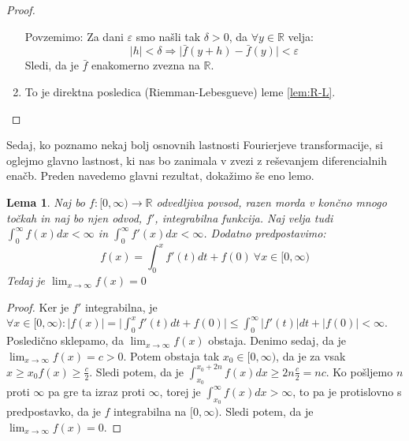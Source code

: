 \documentclass[a4paper, 10pt]{article}
\newtheorem{lem}{Lema}
\newcommand{\abs}[1]{\ensuremath{\lvert #1 \rvert}}
\newcommand{\mth}[1]{\ensuremath{\mathbb{#1}}}
\newcommand{\R}{\mth{R}}
\newcommand{\map}[3]{\ensuremath{{#1}: {#2} \rightarrow {#3}}}
\begin{document}
\begin{proof}
\begin{enumerate}
					Povzemimo: Za dani $\varepsilon$ smo našli tak $\delta> 0$, da $\forall y\in\R$ velja: $$\abs{h} < \delta \Rightarrow \abs{\bar{f}(y+h)-\bar{f}(y)} < \varepsilon$$
					Sledi, da je $\bar{f}$ enakomerno zvezna na $\R$.
					\item To je direktna posledica (Riemman-Lebesgueve) leme \ref{lem:R-L}.
				\end{enumerate}
			\end{proof}
			
			Sedaj, ko poznamo nekaj bolj osnovnih lastnosti Fourierjeve transformacije, si oglejmo glavno lastnost, ki nas bo zanimala v zvezi z reševanjem diferencialnih enačb. Preden navedemo glavni rezultat, dokažimo še eno lemo.
			
			\begin{lem}
				\label{lem:limfx}
				Naj bo $\map{f}{[0, \infty)}{\R}$ odvedljiva povsod, razen morda v končno mnogo točkah in naj bo njen odvod, $f'$, integrabilna funkcija. Naj velja tudi $\int_0^\infty f(x)dx < \infty$ in $\int_0^\infty f'(x)dx < \infty$. Dodatno predpostavimo: $$f(x) = \int_{0}^{x} f'(t)dt + f(0) ~\forall x\in [0,\infty)$$ Tedaj je $\lim_{x\to\infty}f(x) = 0$
			\end{lem}
			\begin{proof}
				Ker je $f'$ integrabilna, je $\forall x\in [0, \infty): \abs{f(x)} = \abs{\int_{0}^{x} f'(t)dt + f(0)} \leq \int_{0}^{\infty} \abs{f'(t)}dt + \abs{f(0)} < \infty$. Posledično sklepamo, da $\lim_{x\to\infty}f(x)$ obstaja. Denimo sedaj, da je $\lim_{x\to\infty}f(x) = c > 0$. Potem obstaja tak $x_0 \in [0, \infty)$, da je za vsak $x\geq x_0 f(x) \geq \frac{c}{2}$. Sledi potem, da je $\int_{x_0}^{x_0 + 2n}f(x)dx \geq 2n\frac{c}{2} = nc$. Ko pošljemo $n$ proti $\infty$ pa gre ta izraz proti $\infty$, torej je $\int_{x_0}^{\infty}f(x)dx > \infty$, to pa je protislovno s predpostavko, da je $f$ integrabilna na $[0, \infty)$. Sledi potem, da je $\lim_{x\to\infty}f(x) = 0$.
			\end{proof}
			
\end{document}
